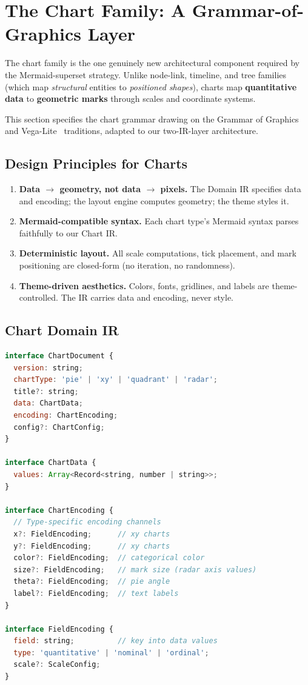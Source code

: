 \section{The Chart Family: A Grammar-of-Graphics Layer}
\label{sec:chart-family}

The chart family is the one genuinely new architectural component required by the
Mermaid-superset strategy. Unlike node-link, timeline, and tree families (which map
\emph{structural} entities to \emph{positioned shapes}), charts map \textbf{quantitative
data} to \textbf{geometric marks} through scales and coordinate systems.

This section specifies the chart grammar drawing on the Grammar of
Graphics~\cite{grammarofgraphics2005} and Vega-Lite~\cite{vegalite2017} traditions,
adapted to our two-IR-layer architecture.

\subsection{Design Principles for Charts}

\begin{enumerate}
  \item \textbf{Data $\to$ geometry, not data $\to$ pixels.} The Domain IR specifies data
        and encoding; the layout engine computes geometry; the theme styles it.
  \item \textbf{Mermaid-compatible syntax.} Each chart type's Mermaid syntax parses
        faithfully to our Chart IR.
  \item \textbf{Deterministic layout.} All scale computations, tick placement, and mark
        positioning are closed-form (no iteration, no randomness).
  \item \textbf{Theme-driven aesthetics.} Colors, fonts, gridlines, and labels are
        theme-controlled. The IR carries data and encoding, never style.
\end{enumerate}

\subsection{Chart Domain IR}

\begin{lstlisting}[language=javascript,caption={Chart Domain IR shape (TypeScript)}]
interface ChartDocument {
  version: string;
  chartType: 'pie' | 'xy' | 'quadrant' | 'radar';
  title?: string;
  data: ChartData;
  encoding: ChartEncoding;
  config?: ChartConfig;
}

interface ChartData {
  values: Array<Record<string, number | string>>;
}

interface ChartEncoding {
  // Type-specific encoding channels
  x?: FieldEncoding;      // xy charts
  y?: FieldEncoding;      // xy charts
  color?: FieldEncoding;  // categorical color
  size?: FieldEncoding;   // mark size (radar axis values)
  theta?: FieldEncoding;  // pie angle
  label?: FieldEncoding;  // text labels
}

interface FieldEncoding {
  field: string;          // key into data values
  type: 'quantitative' | 'nominal' | 'ordinal';
  scale?: ScaleConfig;
}
\end{lstlisting}

